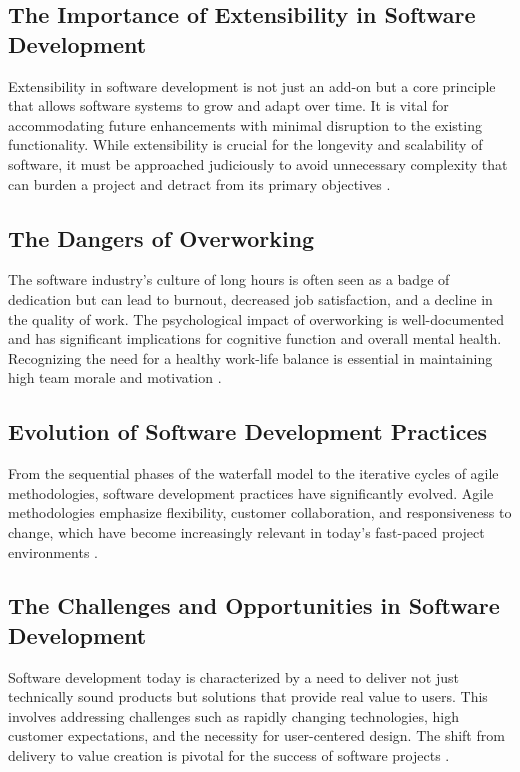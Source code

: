 \documentclass{article}
\begin{document}
\subsection{The Importance of Extensibility in Software Development}
Extensibility in software development is not just an add-on but a core principle that allows software systems to grow and adapt over time. It is vital for accommodating future enhancements with minimal disruption to the existing functionality. While extensibility is crucial for the longevity and scalability of software, it must be approached judiciously to avoid unnecessary complexity that can burden a project and detract from its primary objectives \cite{FayadSchmidt1997}.

\subsection{The Dangers of Overworking}
The software industry's culture of long hours is often seen as a badge of dedication but can lead to burnout, decreased job satisfaction, and a decline in the quality of work. The psychological impact of overworking is well-documented and has significant implications for cognitive function and overall mental health. Recognizing the need for a healthy work-life balance is essential in maintaining high team morale and motivation \cite{Carmichael2015, SinghSuarLeiter2012, Dhas2015WorkLifeBalance}.

\subsection{Evolution of Software Development Practices}
From the sequential phases of the waterfall model to the iterative cycles of agile methodologies, software development practices have significantly evolved. Agile methodologies emphasize flexibility, customer collaboration, and responsiveness to change, which have become increasingly relevant in today's fast-paced project environments \cite{Saeed2019SoftwareDevelopment, Andrei2019WaterfallAgile}.

\subsection{The Challenges and Opportunities in Software Development}
Software development today is characterized by a need to deliver not just technically sound products but solutions that provide real value to users. This involves addressing challenges such as rapidly changing technologies, high customer expectations, and the necessity for user-centered design. The shift from delivery to value creation is pivotal for the success of software projects \cite{Meckenstock2021ECIS}.
\end{document}
